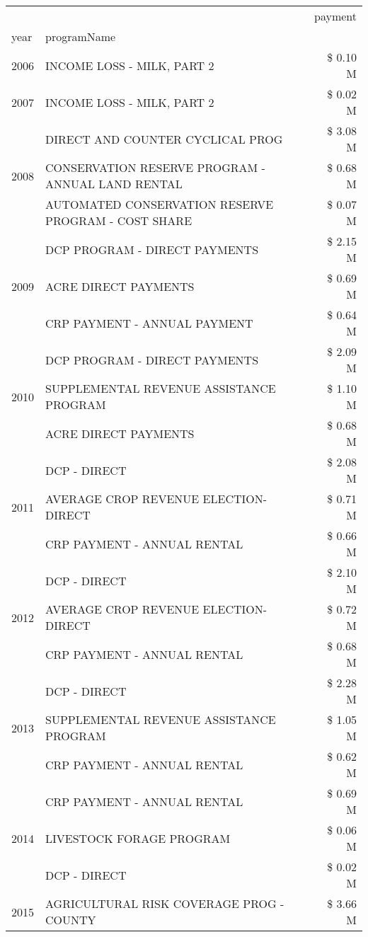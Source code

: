 \begin{tabular}{llr}
\toprule
 &  & payment \\
year & programName &  \\
\midrule
2006 & INCOME LOSS - MILK, PART 2 & \$ 0.10 M \\
\cline{1-3}
2007 & INCOME LOSS - MILK, PART 2 & \$ 0.02 M \\
\cline{1-3}
\multirow[t]{3}{*}{2008} & DIRECT AND COUNTER CYCLICAL PROG & \$ 3.08 M \\
 & CONSERVATION RESERVE PROGRAM - ANNUAL LAND RENTAL & \$ 0.68 M \\
 & AUTOMATED CONSERVATION RESERVE PROGRAM - COST SHARE & \$ 0.07 M \\
\cline{1-3}
\multirow[t]{3}{*}{2009} & DCP PROGRAM - DIRECT PAYMENTS & \$ 2.15 M \\
 & ACRE DIRECT PAYMENTS & \$ 0.69 M \\
 & CRP PAYMENT - ANNUAL PAYMENT & \$ 0.64 M \\
\cline{1-3}
\multirow[t]{3}{*}{2010} & DCP PROGRAM - DIRECT PAYMENTS & \$ 2.09 M \\
 & SUPPLEMENTAL REVENUE ASSISTANCE PROGRAM & \$ 1.10 M \\
 & ACRE DIRECT PAYMENTS & \$ 0.68 M \\
\cline{1-3}
\multirow[t]{3}{*}{2011} & DCP - DIRECT & \$ 2.08 M \\
 & AVERAGE CROP REVENUE ELECTION-DIRECT & \$ 0.71 M \\
 & CRP PAYMENT - ANNUAL RENTAL & \$ 0.66 M \\
\cline{1-3}
\multirow[t]{3}{*}{2012} & DCP - DIRECT & \$ 2.10 M \\
 & AVERAGE CROP REVENUE ELECTION-DIRECT & \$ 0.72 M \\
 & CRP PAYMENT - ANNUAL RENTAL & \$ 0.68 M \\
\cline{1-3}
\multirow[t]{3}{*}{2013} & DCP - DIRECT & \$ 2.28 M \\
 & SUPPLEMENTAL REVENUE ASSISTANCE PROGRAM & \$ 1.05 M \\
 & CRP PAYMENT - ANNUAL RENTAL & \$ 0.62 M \\
\cline{1-3}
\multirow[t]{3}{*}{2014} & CRP PAYMENT - ANNUAL RENTAL & \$ 0.69 M \\
 & LIVESTOCK FORAGE PROGRAM & \$ 0.06 M \\
 & DCP - DIRECT & \$ 0.02 M \\
\cline{1-3}
\multirow[t]{3}{*}{2015} & AGRICULTURAL RISK COVERAGE PROG - COUNTY & \$ 3.66 M \\

\end{tabular}

